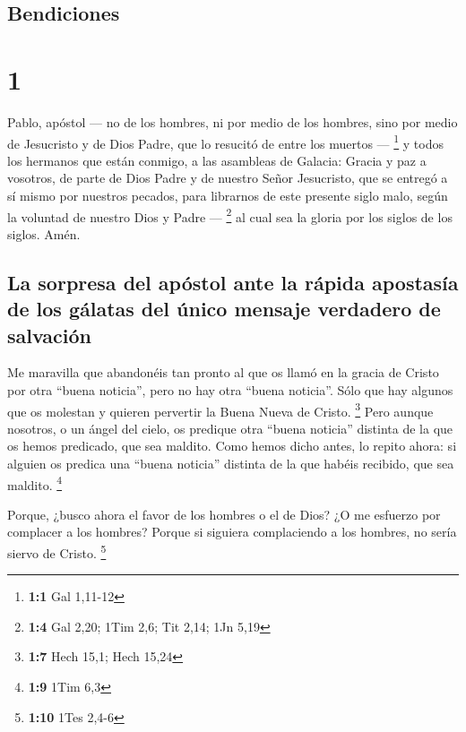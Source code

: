 \hypertarget{bendiciones}{%
\subsection{Bendiciones}\label{bendiciones}}

\hypertarget{section}{%
\section{1}\label{section}}

 Pablo, apóstol --- no de los hombres, ni por medio de los
hombres, sino por medio de Jesucristo y de Dios Padre, que lo resucitó
de entre los muertos --- \footnote{\textbf{1:1} Gal 1,11-12}
 y todos los hermanos que están conmigo, a las asambleas
de Galacia:  Gracia y paz a vosotros, de parte de Dios
Padre y de nuestro Señor Jesucristo,  que se entregó a sí
mismo por nuestros pecados, para librarnos de este presente siglo malo,
según la voluntad de nuestro Dios y Padre --- \footnote{\textbf{1:4} Gal
  2,20; 1Tim 2,6; Tit 2,14; 1Jn 5,19}  al cual sea la
gloria por los siglos de los siglos. Amén.

\hypertarget{la-sorpresa-del-apuxf3stol-ante-la-ruxe1pida-apostasuxeda-de-los-guxe1latas-del-uxfanico-mensaje-verdadero-de-salvaciuxf3n}{%
\subsection{La sorpresa del apóstol ante la rápida apostasía de los
gálatas del único mensaje verdadero de
salvación}\label{la-sorpresa-del-apuxf3stol-ante-la-ruxe1pida-apostasuxeda-de-los-guxe1latas-del-uxfanico-mensaje-verdadero-de-salvaciuxf3n}}

 Me maravilla que abandonéis tan pronto al que os llamó en
la gracia de Cristo por otra ``buena noticia'',  pero no
hay otra ``buena noticia''. Sólo que hay algunos que os molestan y
quieren pervertir la Buena Nueva de Cristo. \footnote{\textbf{1:7} Hech
  15,1; Hech 15,24}  Pero aunque nosotros, o un ángel del
cielo, os predique otra ``buena noticia'' distinta de la que os hemos
predicado, que sea maldito.  Como hemos dicho antes, lo
repito ahora: si alguien os predica una ``buena noticia'' distinta de la
que habéis recibido, que sea maldito. \footnote{\textbf{1:9} 1Tim 6,3}

 Porque, ¿busco ahora el favor de los hombres o el de
Dios? ¿O me esfuerzo por complacer a los hombres? Porque si siguiera
complaciendo a los hombres, no sería siervo de Cristo. \footnote{\textbf{1:10}
  1Tes 2,4-6}

